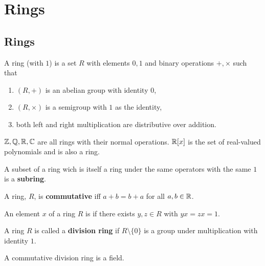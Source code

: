 \documentclass[../Year2.tex]{subfiles}
\begin{document}
\section{Rings}

\subsection{Rings}

\begin{definition}[Ring]
    A ring (with $1$) is a set $R$ with elements $0,1$ and binary operations $+,\times$ such that \begin{enumerate}
        \item $(R,+)$ is an abelian group with identity $0$,
        \item $(R,\times)$ is a semigroup with $1$ as the identity,
        \item both left and right multiplication are distributive over addition.
    \end{enumerate}
\end{definition}

\begin{examples}
    $\mathbb{Z},\mathbb{Q},\mathbb{R},\mathbb{C}$ are all rings with their normal operations. $\mathbb{R}[x]$ is the set of real-valued polynomials and is also a ring.
\end{examples}

\begin{definition}[Subring]
    A subset of a ring wich is itself a ring under the same operators with the same $1$ is a \textbf{subring}.
\end{definition}

\begin{definition}
    A ring, $R$, is \textbf{commutative} iff $a+b=b+a$ for all $a,b\in\mathbb{R}$.
\end{definition}

\begin{definition}[Invertible]
    An element $x$ of a ring $R$ is  if there exists $y,z\in R$ with $yx=zx=1$.
\end{definition}

\begin{definition}
    A ring $R$ is called a \textbf{division ring} if $R\setminus\{0\}$ is a group under multiplication with identity $1$.
\end{definition}

\begin{remark}
    A commutative division ring is a field.
\end{remark}
\end{document}
